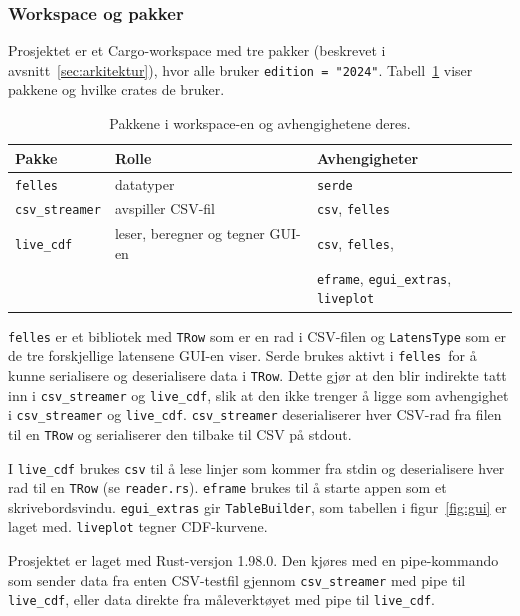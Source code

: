 \documentclass[norsk]{uiobachelorthesis}
\begin{document}
\subsubsection{Workspace og pakker}
\label{sec:impl-workspace} 
Prosjektet er et Cargo-workspace med tre pakker (beskrevet i avsnitt~\ref{sec:arkitektur}), hvor alle bruker \texttt{edition = "2024"}. 
Tabell~\ref{tab:pakker} viser pakkene og hvilke crates de bruker. 
\begin{table}[htbp]
\centering
\caption{Pakkene i workspace-en og avhengighetene deres.}
\label{tab:pakker}
\begin{tabular}{lll}
\hline
Pakke & Rolle & Avhengigheter \\
\hline
\texttt{felles} & datatyper & \texttt{serde} \\
\texttt{csv\_streamer} & avspiller CSV-fil & \texttt{csv}, \texttt{felles} \\
\texttt{live\_cdf} & leser, beregner og tegner GUI-en & \texttt{csv}, \texttt{felles}, \\
                      &     & \texttt{eframe}, \texttt{egui\_extras}, \texttt{liveplot}\\
\hline
\end{tabular}
\end{table}
\texttt{felles} er et bibliotek med \texttt{TRow} som er en rad i CSV-filen og \texttt{LatensType} som er de tre forskjellige latensene GUI-en viser. Serde brukes aktivt i \texttt{felles} for å kunne serialisere og deserialisere data i \texttt{TRow}. Dette gjør at den blir indirekte tatt inn i \texttt{csv\_streamer} og \texttt{live\_cdf}, slik at den ikke trenger å ligge som avhengighet i \texttt{csv\_streamer} og \texttt{live\_cdf}. 
\texttt{csv\_streamer} deserialiserer hver CSV-rad fra filen til en \texttt{TRow} og serialiserer den tilbake til CSV på stdout.

I \texttt{live\_cdf} brukes \texttt{csv} til å lese linjer som kommer fra stdin og deserialisere hver rad til en \texttt{TRow} (se \texttt{reader.rs}).
\texttt{eframe} brukes til å starte appen som et skrivebordsvindu.
 \texttt{egui\_extras} gir \texttt{TableBuilder}, som tabellen i figur~\ref{fig:gui} er laget med.
 \texttt{liveplot} tegner CDF-kurvene.  

Prosjektet er laget med Rust-versjon 1.98.0. Den kjøres med en pipe-kommando som sender data fra enten CSV-testfil gjennom \texttt{csv\_streamer} med pipe til \texttt{live\_cdf}, eller data direkte fra måleverktøyet med pipe til \texttt{live\_cdf}. 
\end{document}
